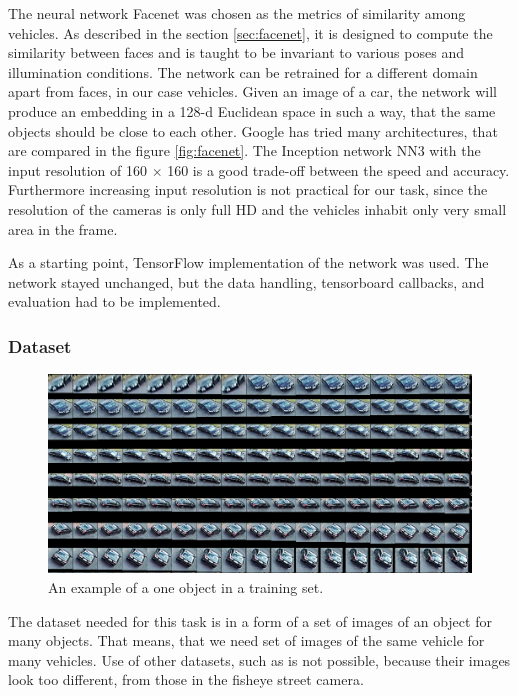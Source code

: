 \documentclass[a4paper,11pt,titlepage,twoside]{article}
\numberwithin{figure}{section}
\begin{document}
The neural network Facenet \cite{schroff2015facenet} was chosen as the metrics of similarity among vehicles. As described in the section \ref{sec:facenet}, it is designed to compute the similarity between faces and is taught to be invariant to various poses and illumination conditions. The network can be retrained for a different domain apart from faces, in our case vehicles. Given an image of a car, the network will produce an embedding in a 128-d Euclidean space in such a way, that the same objects should be close to each other. Google has tried many architectures, that are compared in the figure \ref{fig:facenet}. The Inception network NN3 with the input resolution of 160 $\times$ 160 is a good trade-off between the speed and accuracy. Furthermore increasing input resolution is not practical for our task, since the resolution of the cameras is only full HD and the vehicles inhabit only very small area in the frame.

As a starting point, TensorFlow implementation of the network \cite{facenet} was used. The network stayed unchanged, but the data handling, tensorboard callbacks, and evaluation had to be implemented.

\subsubsection{Dataset}
\begin{figure}[h!]
\centering
\includegraphics[width=1\linewidth]{fig/facenet/labeling.png}
\caption{An example of a one object in a training set.}
\label{fig:facenet-labeling}
\end{figure}

The dataset needed for this task is in a form of a set of images of an object for many objects. That means, that we need set of images of the same vehicle for many vehicles. Use of other datasets, such as \cite{standford} is not possible, because their images look too different, from those in the fisheye street camera.
\end{document}
